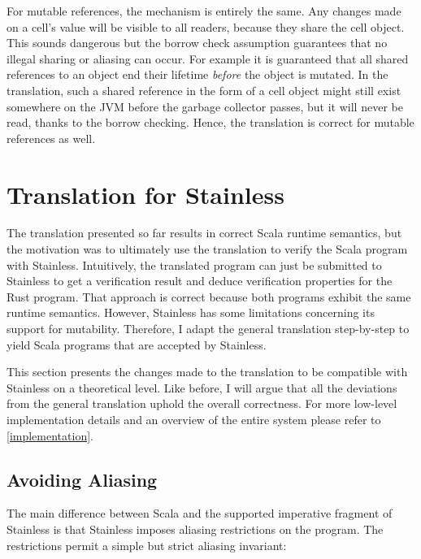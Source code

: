 For mutable references, the mechanism is entirely the same. Any changes made on
a cell's value will be visible to all readers, because they share the cell
object. This sounds dangerous but the borrow check assumption guarantees that no
illegal sharing or aliasing can occur. For example it is guaranteed that all
shared references to an object end their lifetime \emph{before} the object is
mutated. In the translation, such a shared reference in the form of a cell
object might still exist somewhere on the JVM before the garbage collector
passes, but it will never be read, thanks to the borrow checking. Hence, the
translation is correct for mutable references as well.



\section{Translation for Stainless}

The translation presented so far results in correct Scala runtime semantics, but
the motivation was to ultimately use the translation to verify the Scala program
with Stainless. Intuitively, the translated program can just be submitted to
Stainless to get a verification result and deduce verification properties for
the Rust program. That approach is correct because both programs exhibit the
same runtime semantics. However, Stainless has some limitations concerning its
support for mutability. Therefore, I adapt the general translation step-by-step
to yield Scala programs that are accepted by Stainless.

This section presents the changes made to the translation to be compatible with
Stainless on a theoretical level. Like before, I will argue  that all the
deviations from the general translation uphold the overall correctness. For more
low-level implementation details and an overview of the entire system please
refer to \autoref{implementation}.



\subsection{Avoiding Aliasing}
\label{sec:aliasing-restrictions}

The main difference between Scala and the supported imperative fragment of
Stainless \cite[section ``Imperative'']{stainless-doc} is that Stainless imposes
aliasing restrictions on the program. The restrictions permit a simple but
strict aliasing invariant:


